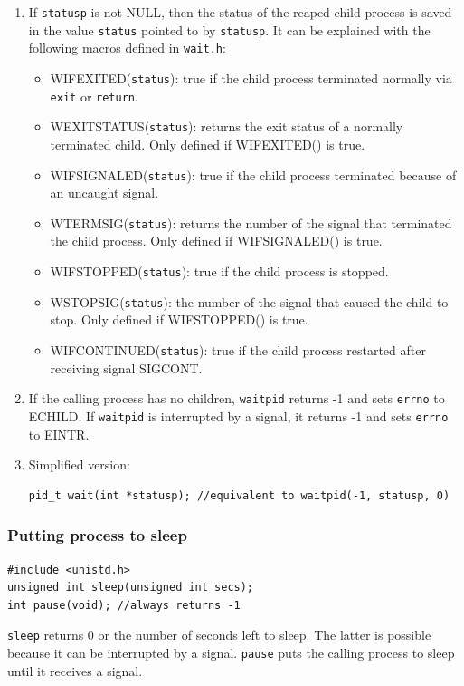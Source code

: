 \begin{enumerate}
\item If \texttt{statusp} is not NULL, then the status of the reaped child process is saved in the value \texttt{status} pointed to by \texttt{statusp}. It can be explained with the following macros defined in \texttt{wait.h}:
\begin{itemize}
	\item WIFEXITED(\texttt{status}): true if the child process terminated normally via \texttt{exit} or \texttt{return}.
	\item WEXITSTATUS(\texttt{status}): returns the exit status of a normally terminated child. Only defined if WIFEXITED() is true.
	\item WIFSIGNALED(\texttt{status}): true if the child process terminated because of an uncaught signal.
	\item WTERMSIG(\texttt{status}): returns the number of the signal that terminated the child process. Only defined if WIFSIGNALED() is true.
	\item WIFSTOPPED(\texttt{status}): true if the child process is stopped.
	\item WSTOPSIG(\texttt{status}): the number of the signal that caused the child to stop. Only defined if WIFSTOPPED() is true.
	\item WIFCONTINUED(\texttt{status}): true if the child process restarted after receiving signal SIGCONT.
\end{itemize}
\item If the calling process has no children, \texttt{waitpid} returns -1 and sets \texttt{errno} to ECHILD. If \texttt{waitpid} is interrupted by a signal, it returns -1 and sets \texttt{errno} to EINTR.
\item Simplified version:
\begin{lstlisting}[frame=single]
pid_t wait(int *statusp); //equivalent to waitpid(-1, statusp, 0)
\end{lstlisting}
\end{enumerate}
\subsubsection{Putting process to sleep}
\begin{lstlisting}[frame=single]
#include <unistd.h>
unsigned int sleep(unsigned int secs);
int pause(void); //always returns -1
\end{lstlisting}
\texttt{sleep} returns 0 or the number of seconds left to sleep. The latter is possible because it can be interrupted by a signal. \texttt{pause} puts the calling process to sleep until it receives a signal.
